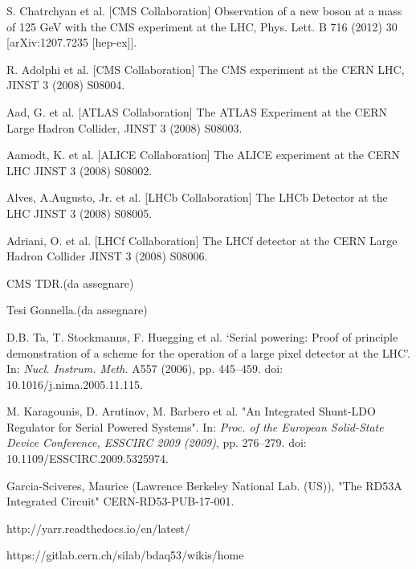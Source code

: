 \begin{thebibliography}{1}

 S. Chatrchyan et al. [CMS Collaboration] Observation of a new boson at a mass of 125 GeV with the CMS experiment at the LHC, Phys. Lett. B 716 (2012) 30 [arXiv:1207.7235 [hep-ex]].

 R. Adolphi et al. [CMS Collaboration] The CMS experiment at the CERN LHC,
JINST 3 (2008) S08004.

Aad, G. et al. [ATLAS Collaboration] The ATLAS Experiment at the CERN Large
Hadron Collider, JINST 3 (2008) S08003. 

Aamodt, K. et al. [ALICE Collaboration] The ALICE experiment at the CERN
LHC JINST 3 (2008) S08002.

Alves, A.Augusto, Jr. et al. [LHCb Collaboration] The LHCb Detector at the LHC
JINST 3 (2008) S08005.

Adriani, O. et al. [LHCf Collaboration] The LHCf detector at the CERN Large
Hadron Collider JINST 3 (2008) S08006.

 CMS TDR.(da assegnare)

 Tesi Gonnella.(da assegnare)

 D.B. Ta, T. Stockmanns, F. Huegging et al. ‘Serial powering: Proof of principle demonstration of a scheme for the operation of a large pixel detector at the LHC’. In: \textit{Nucl. Instrum. Meth.} A557 (2006), pp. 445–459. doi: 10.1016/j.nima.2005.11.115.

 M. Karagounis, D. Arutinov, M. Barbero et al. "An Integrated Shunt-LDO Regulator
for Serial Powered Systems". In: \textit{Proc. of the European Solid-State Device Conference,
ESSCIRC 2009 (2009)}, pp. 276–279. doi: 10.1109/ESSCIRC.2009.5325974.

 Garcia-Sciveres, Maurice (Lawrence Berkeley National Lab. (US)), "The RD53A Integrated Circuit" CERN-RD53-PUB-17-001.

 http://yarr.readthedocs.io/en/latest/

 https://gitlab.cern.ch/silab/bdaq53/wikis/home

\end{thebibliography}